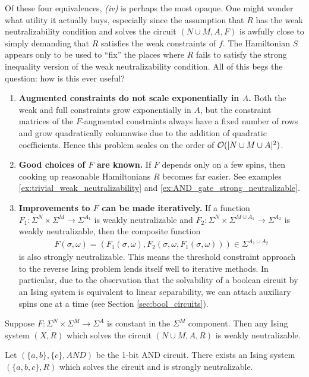 \documentclass{article}
\begin{document}
\begin{rmk}
  Of these four equivalences, \emph{(iv)} is perhaps the most opaque. One might wonder what utility it actually buys, especially since the assumption that $R$ has the weak neutralizability condition and solves the circuit $(N\cup M, A, F)$ is awfully close to simply demanding that $R$ satisfies the weak constraints of $f$. The Hamiltonian $S$ appears only to be used to ``fix'' the places where $R$ fails to satisfy the strong inequality version of the weak neutralizability condition. All of this begs the question: how is this ever useful?

  \begin{enumerate}
    \item \textbf{Augmented constraints do not scale exponentially in $A$.} Both the weak and full constraints grow exponentially in $A$, but the constraint matrices of the $F$-augmented constraints always have a fixed number of rows and grow quadratically columnwise due to the addition of quadratic coefficients. Hence this problem scales on the order of $\mathcal{O}(|N \cup M \cup A|^2)$.
    \item \textbf{Good choices of $F$ are known.} If $F$ depends only on a few spins, then cooking up reasonable Hamiltonians $R$ becomes far easier. See examples \ref{ex:trivial_weak_neutralizability} and \ref{ex:AND_gate_strong_neutralizable}.
    \item \textbf{Improvements to $F$ can be made iteratively.} If a function $F_1:\Sigma^N \times \Sigma^M \to \Sigma^{A_1}$ is weakly neutralizable and $F_2:\Sigma^N\times \Sigma^{M\cup A_1} \to \Sigma^{A_2}$ is weakly neutralizable, then the composite function
      \begin{align*}
        F(\sigma, \omega) = (F_1(\sigma, \omega), F_2(\sigma, \omega, F_1(\sigma, \omega))) \in \Sigma^{A_1 \cup A_2}
      \end{align*}
      is also strongly neutralizable. This means the threshold constraint approach to the reverse Ising problem lends itself well to iterative methods. In particular, due to the observation that the solvability of a boolean circuit by an Ising system is equivalent to linear separability, we can attach auxiliary spins one at a time (see Section \ref{sec:bool_circuits}).
  \end{enumerate}
\end{rmk}

\begin{example}\label{ex:trivial_weak_neutralizability}
  Suppose $F:\Sigma^N \times \Sigma^M \to \Sigma^A$ is constant in the $\Sigma^M$ component. Then any Ising system $(X, R)$ which solves the circuit $(N\cup M, A, R)$ is weakly neutralizable.
\end{example}
\begin{example}\label{ex:AND_gate_strong_neutralizable}
  Let $(\{a,b\}, \{c\}, AND)$ be the 1-bit AND circuit. There exists an Ising system $(\{a,b,c\}, R)$ which solves the circuit and is strongly neutralizable.
\end{example}
\end{document}
